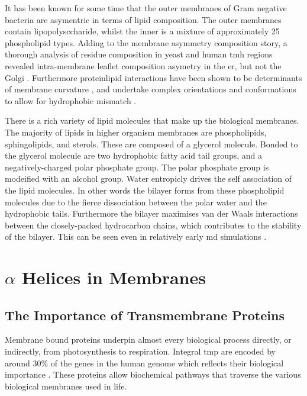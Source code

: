 It has been known for some time that the outer membranes of Gram negative bacteria are asymentric in terms of lipid composition. The outer membranes contain lipopolysccharide, whilst the inner is a mixture of approximately 25 phospholipid types. Adding to the membrane asymmetry composition story, a thorough analysis of residue composition in yeast and human \gls{tmh} regions revealed intra-membrane leaflet composition asymetry in the \gls{er}, but not the Golgi \cite{Sharpe2010}. Furthermore protein\-lipid interactions have been shown to be determinants of membrane curvature \cite{Jensen2004}, and undertake complex orientations and conformations to allow for hydrophobic mismatch \cite{Planque2003}. %

There is a rich variety of lipid molecules that make up the biological membranes. The majority of lipids in higher organism membranes are phospholipids, sphingolipids, and sterols. These are composed of a glycerol molecule. Bonded to the glycerol molecule are two hydrophobic fatty acid tail groups, and a negatively-charged polar phosphate group. The polar phosphate group is modeified with an alcohol group. Water entropicly drives the self association of the lipid molecules. In other words the bilayer forms from these phospholipid molecules due to the fierce dissociation between the polar water and the hydrophobic tails. Furthermore the bilayer maximises van der Waals interactions between the closely-packed hydrocarbon chains, which contributes to the stability of the bilayer. This can be seen even in relatively early \gls{md} simulations \cite{Goetz1998}.

\section{$\alpha$ Helices in Membranes }
\subsection{The Importance of Transmembrane Proteins}
Membrane bound proteins underpin almost every biological process directly, or indirectly, from photosynthesis to respiration. Integral \gls{tmp} are encoded by around 30\% of the genes in the human genome which reflects their biological importance \cite{Almen2009}. These proteins allow biochemical pathways that traverse the various biological membranes used in life. %

